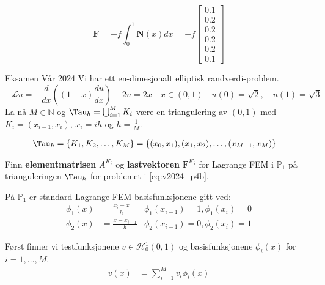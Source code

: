 \begin{equation*}
    \symbf{F} = - \bar{f} \int_0^1 \symbf{N}(x) dx = - \bar{f} \begin{bmatrix}
        0.1 \\ 0.2 \\ 0.2 \\ 0.2 \\ 0.2 \\ 0.1
    \end{bmatrix}
\end{equation*}


\begin{example}{Eksamen Vår 2024}{}
    Vi har ett en-dimesjonalt elliptisk randverdi-problem.
    \begin{equation*}
        -\mathcal{L}u  = -\frac{d}{dx} \left( (1 + x) \frac{du}{dx} \right) + 2u = 2x \quad x \in (0, 1) \quad
        u(0)           = \sqrt{2}, \quad u(1) = \sqrt{3}
        \label{eq:v2024_p4b}
    \end{equation*}
    La nå \(M \in \mathbb{N}\) og \(\Tau_h = \bigcup_{i=1}^M K_i\) være en triangulering av \((0, 1)\) med \(K_i = (x_{i-1}, x_i)\), \(x_i = ih\) og \(h = \frac{1}{M}\).

    \begin{align*}
        \Tau_h & = \{K_1, K_2, \ldots, K_M\}=\{(x_0, x_1), (x_1, x_2), \ldots, (x_{M-1}, x_M)\}
    \end{align*}

    Finn \textbf{elementmatrisen} $A^{K_i}$ og \textbf{lastvektoren} $\symbf{F}^{K_i}$ for Lagrange FEM i $\mathbb{P}_1$ på trianguleringen $\Tau_h$ for problemet i \eqref{eq:v2024_p4b}.

    På $\mathbb{P}_1$ er standard Lagrange-FEM-basisfunksjonene gitt ved:
    \begin{align*}
        \phi_1(x) & = \frac{x_i - x}{h}     & \phi_1(x_{i-1}) = 1, \phi_1(x_i) = 0 \\
        \phi_2(x) & = \frac{x - x_{i-1}}{h} & \phi_2(x_{i-1}) = 0, \phi_2(x_i) = 1
    \end{align*}

    Først finner vi testfunksjonene \(v \in \mathcal{H}_0^1(0, 1)\) og basisfunksjonene \(\phi_i(x)\) for \(i = 1, \ldots, M\).
    \begin{align*}
        v(x) & = \sum_{i=1}^M v_i \phi_i(x) \\
    \end{align*}
\end{example}


